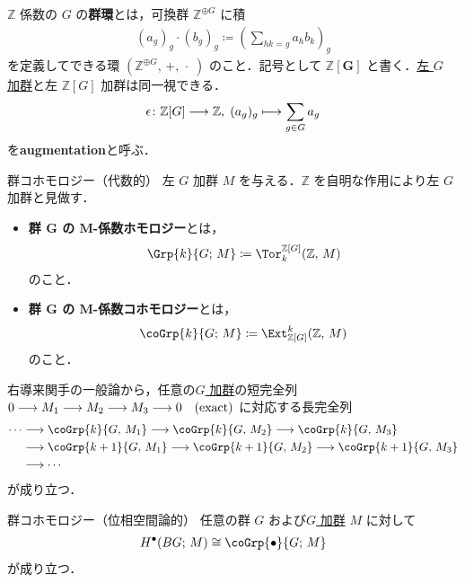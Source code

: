 \documentclass[TQFT_main]{subfiles}
\begin{document}
$\mathbb{Z}$ 係数の $G$ の\textbf{群環}とは，可換群 $\mathbb{Z}^{\oplus G}$ に積
\begin{align}
    (a_g)_g \cdot (b_g)_g \coloneqq \left( \sum_{hk = g} a_h b_k \right)_g
\end{align}
を定義してできる環 $(\mathbb{Z}^{\oplus G},\, +,\, \cdot\; )$ のこと．記号として $\bm{\mathbb{Z}[G]}$ と書く．\hyperref[ax:G-mod]{左 $G$ 加群}と左 $\mathbb{Z}[G]$ 加群は同一視できる．
\begin{align}
    \epsilon \colon \mathbb{Z}[G] \longrightarrow \mathbb{Z},\; (a_g)_g \longmapsto \sum_{g \in G} a_g
\end{align}
を\textbf{augmentation}と呼ぶ．

\begin{mydef}[label=def:group-cohomology]{群コホモロジー（代数的）}
    左 $G$ 加群 $M$ を与える．$\mathbb{Z}$ を自明な作用により左 $G$ 加群と見做す．
    \begin{itemize}
        \item \textbf{群 $\bm{G}$ の $\bm{M}$-係数ホモロジー}とは，
        \begin{align}
            \Grp{k}{G;\, M} \coloneqq \Tor^{\mathbb{Z}[G]}_k (\mathbb{Z},\, M)
        \end{align}
        のこと．
        \item \textbf{群 $\bm{G}$ の $\bm{M}$-係数コホモロジー}とは，
        \begin{align}
            \coGrp{k}{G;\, M} \coloneqq \Ext_{\mathbb{Z}[G]}^k (\mathbb{Z},\, M)
        \end{align}
        のこと．
    \end{itemize}
\end{mydef}
右導来関手の一般論から，任意の\hyperref[ax:G-mod]{$G$ 加群}の短完全列 $0 \longrightarrow M_1 \longrightarrow M_2 \longrightarrow M_3 \longrightarrow 0\quad (\text{exact})$ に対応する長完全列
\begin{align}
    \label{eq:LES-coGrp}
    \cdots 
    &\lto \coGrp{k}{G,\, M_1} \lto \coGrp{k}{G,\, M_2} \lto \coGrp{k}{G,\, M_3} \\
    &\lto \coGrp{k+1}{G,\, M_1} \lto \coGrp{k+1}{G,\, M_2} \lto \coGrp{k+1}{G,\, M_3} \\
    &\lto \cdots
\end{align}
が成り立つ．

\begin{mytheo}[label=thm:group-cohomology-top]{群コホモロジー（位相空間論的）}
    任意の群 $G$ および\hyperref[ax:G-mod]{$G$ 加群} $M$ に対して
    \begin{align}
        H^\bullet (BG;\, M) \cong \coGrp{\bullet}{G;\, M}
    \end{align}
    が成り立つ．
\end{mytheo}
\end{document}
